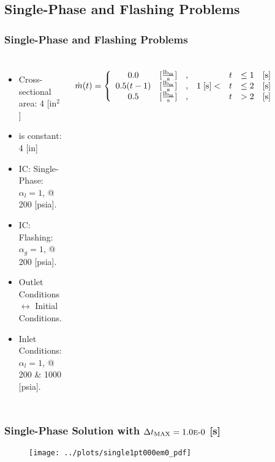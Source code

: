 \documentclass[compress,xcolor=table]{beamer}
\begin{document}
\subsection[Single-Phase and Flashing]{Single-Phase and Flashing Problems}
\begin{frame}
\frametitle{Single-Phase and Flashing Problems}
\begin{columns}

\begin{itemize}
\item{Cross-sectional area: 4 [in$^2$]}
\item{\dx{} is constant: 4 [in]}
\item{IC: Single-Phase: $\alpha_{l} = 1$, @ 200 [psia].}
\item{IC: Flashing: $\alpha_{g}=1$, @ 200 [psia].}
\item{Outlet Conditions $\longleftrightarrow$ Initial Conditions.}
\item{Inlet Conditions: $\alpha_{l}=1$, @ 200 \& 1000 [psia].}
\end{itemize}
\begin{equation*}
\dot{m}(t) = \left\{
\begin{array}{cclrcll}
 0.0           & [\frac{ \lbm{} }{\text{s}}] & , &                & t & \leq 1 & [\text{s}] \\
 0.5 ( t - 1)  & [\frac{ \lbm{} }{\text{s}}] & , & 1\; [\text{s}] < & t & \leq 2 & [\text{s}] \\
 0.5           & [\frac{ \lbm{} }{\text{s}}] & , &                & t & > 2    & [\text{s}]
\end{array}\right.
\end{equation*}

\begin{figure}[h!t]
\centering
\resizebox{\textwidth}{0.6\textheight}{

}

\end{figure}
\end{columns}
\end{frame}
\begin{frame}
\frametitle{Single-Phase Solution with $\dtmax{} = \expneg{1.0}{0}$ [s]}

\begin{figure}[h!t]
\centering
\texttt{[image: ../plots/single1pt000em0\_pdf]}
\end{figure}

\end{frame}
\end{document}
